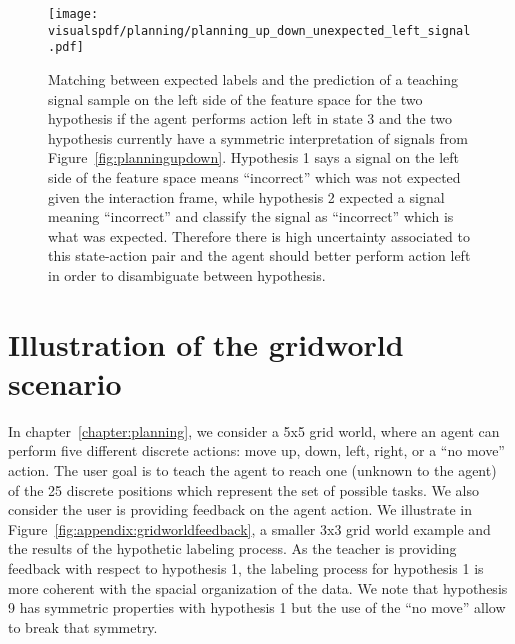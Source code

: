 \begin{figure}[!ht]
  \centering
  \texttt{[image: \\visualspdf/planning/planning\_up\_down\_unexpected\_left\_signal.pdf]}
  \caption{Matching between expected labels and the prediction of a teaching signal sample on the left side of the feature space for the two hypothesis if the agent performs action left in state 3 and the two hypothesis currently have a symmetric interpretation of signals from Figure~\ref{fig:planningupdown}. Hypothesis 1 says a signal on the left side of the feature space means ``incorrect'' which was not expected given the interaction frame, while hypothesis 2 expected a signal meaning ``incorrect'' and classify the signal as ``incorrect'' which is what was expected. Therefore there is high uncertainty associated to this state-action pair and the agent should better perform action left in order to disambiguate between hypothesis.}
  \label{fig:uncertaintymeaningupdownunexpectedleft}
\end{figure}


\section{Illustration of the gridworld scenario}
\label{appendix:gridworld}

In chapter~\ref{chapter:planning}, we consider a 5x5 grid world, where an agent can perform five different discrete actions: move up, down, left, right, or a ``no move'' action. The user goal is to teach the agent to reach one (unknown to the agent) of the 25 discrete positions which represent the set of possible tasks. We also consider the user is providing feedback on the agent action. We illustrate in Figure~\ref{fig:appendix:gridworldfeedback}, a smaller 3x3 grid world example and the results of the hypothetic labeling process. As the teacher is providing feedback with respect to hypothesis 1, the labeling process for hypothesis 1 is more coherent with the spacial organization of the data. We note that hypothesis 9 has symmetric properties with hypothesis 1 but the use of the ``no move'' allow to break that symmetry.

